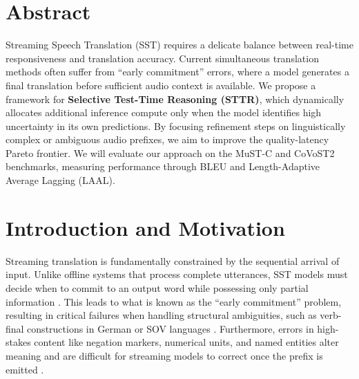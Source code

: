 \section{Abstract}
Streaming Speech Translation (SST) requires a delicate balance between real-time responsiveness and translation accuracy. Current simultaneous translation methods often suffer from ``early commitment'' errors, where a model generates a final translation before sufficient audio context is available. We propose a framework for \textbf{Selective Test-Time Reasoning (STTR)}, which dynamically allocates additional inference compute only when the model identifies high uncertainty in its own predictions. By focusing refinement steps on linguistically complex or ambiguous audio prefixes, we aim to improve the quality-latency Pareto frontier. We will evaluate our approach on the MuST-C and CoVoST2 benchmarks, measuring performance through BLEU and Length-Adaptive Average Lagging (LAAL).




\section{Introduction and Motivation}
Streaming translation is fundamentally constrained by the sequential arrival of input. Unlike offline systems that process complete utterances, SST models must decide when to commit to an output word while possessing only partial information \citep{ma2019stacl}. This leads to what is known as the ``early commitment'' problem, resulting in critical failures when handling structural ambiguities, such as verb-final constructions in German or SOV languages \citep{gu2017learning}. Furthermore, errors in high-stakes content like negation markers, numerical units, and named entities alter meaning and are difficult for streaming models to correct once the prefix is emitted \citep{papi2025real}.

